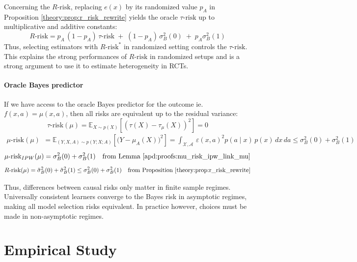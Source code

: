 \documentclass[french,12pt,twoside,a4paper]{book}
\begin{document}
Concerning the $R\text{-risk}$, replacing $e(x)$ by its randomized value $p_A$
in Proposition \ref{theory:prop:r_risk_rewrite} yields the oracle
$\tau\text{-risk}$ up to multiplicative and additive constants:
\begin{equation*}
  R\text{-risk} = p_A \, (1-p_A) \, \tau\text{-risk} \;+\; (1 - p_A) \,\sigma_B^2(0) \;+\; p_A \sigma_B^2(1)
\end{equation*}
Thus, selecting estimators with $R\text{-risk}^*$ in
randomized setting controls the $\tau\text{-risk}$. This explains
the strong performances of $R\text{-risk}$ in randomized setups
\citep{schuler_comparison_2018} and is a strong argument to use it
to estimate heterogeneity in RCTs.

\paragraph{Oracle Bayes predictor}\label{remark:bayes_oracle} If we
have access to the oracle Bayes predictor for the outcome ie.~$f(x,
  a)=\mu(x, a)$, then all risks are equivalent up to the residual variance:
\begin{equation}
  \tau\text{-risk}(\mu) = \mathbb E_{X\sim p(X)}[(\tau(X) - \tau_{\mu}(X))^2] = 0
\end{equation}
\begin{align}
  \mu\text{-risk}(\mu) & = \mathbb E_{(Y, X, A) \sim p(Y;X;A)}[\big( Y - \mu_A(X)\big)^2]
  = \int_{\mathcal X, \mathcal A}
  \,\varepsilon(x,a)^2 p(a \mid x) \,p(x) \,dx\,da  \leq \sigma_B^{2}(0) + \sigma_B^{2}(1)
\end{align}
\begin{equation}
  \mu\text{-risk}_{IPW}(\mu) = \sigma_B^{2}(0) + \sigma_B^{2}(1)  \quad \text{from Lemma \ref{apd:proofs:mu_risk_ipw_link_mu}}
\end{equation}
\begin{equation}
  R\text{-risk}(\mu) = \tilde{\sigma}_B^{2}(0) + \tilde{\sigma}_B^{2}(1)
  \leq \sigma_B^{2}(0) + \sigma_B^{2}(1)  \quad  \text{from Proposition \ref{theory:prop:r_risk_rewrite}}%
\end{equation}

Thus, differences between causal risks only matter in finite sample regimes.
Universally consistent learners converge to the Bayes risk in asymptotic
regimes, making all model selection risks equivalent. In practice however,
choices must be made in non-asymptotic regimes.



\section{Empirical Study}\label{sec:empirical_study}
\end{document}
